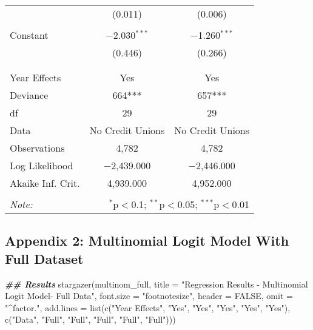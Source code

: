 \documentclass[a4paper,nobind]{templates/ociamthesis}
\newenvironment{Shaded}{\begin{snugshade}}{\end{snugshade}}
\newcommand{\AttributeTok}[1]{\textcolor[rgb]{0.77,0.63,0.00}{#1}}
\newcommand{\ConstantTok}[1]{\textcolor[rgb]{0.00,0.00,0.00}{#1}}
\newcommand{\DocumentationTok}[1]{\textcolor[rgb]{0.56,0.35,0.01}{\textbf{\textit{#1}}}}
\newcommand{\FunctionTok}[1]{\textcolor[rgb]{0.00,0.00,0.00}{#1}}
\newcommand{\NormalTok}[1]{#1}
\newcommand{\StringTok}[1]{\textcolor[rgb]{0.31,0.60,0.02}{#1}}
\renewenvironment{Shaded}
{
  \vspace{10pt}%
  \begin{snugshade}%
}{%
  \end{snugshade}%
  \vspace{8pt}%
}
\begin{document}
\begin{table}[!htbp]
\begin{tabular}{@{\extracolsep{5pt}}lcc}
  & (0.011) & (0.006) \\ 
  & & \\ 
 Constant & $-$2.030$^{***}$ & $-$1.260$^{***}$ \\ 
  & (0.446) & (0.266) \\ 
  & & \\ 
\hline \\[-1.8ex] 
Year Effects & Yes & Yes \\ 
Deviance & 664*** & 657*** \\ 
df & 29 & 29 \\ 
Data & No Credit Unions & No Credit Unions \\ 
Observations & 4,782 & 4,782 \\ 
Log Likelihood & $-$2,439.000 & $-$2,446.000 \\ 
Akaike Inf. Crit. & 4,939.000 & 4,952.000 \\ 
\hline 
\hline \\[-1.8ex] 
\textit{Note:}  & \multicolumn{2}{r}{$^{*}$p$<$0.1; $^{**}$p$<$0.05; $^{***}$p$<$0.01} \\ 
\end{tabular} 
\end{table}

\newpage

\hypertarget{appendix-2-multinomial-logit-model-with-full-dataset}{%
\subsection{Appendix 2: Multinomial Logit Model With Full Dataset}\label{appendix-2-multinomial-logit-model-with-full-dataset}}

\begin{Shaded}
\begin{Highlighting}[]
\DocumentationTok{\#\# Results }
\FunctionTok{stargazer}\NormalTok{(multinom\_full, }\AttributeTok{title =} \StringTok{"Regression Results {-} Multinomial Logit Model{-} Full Data"}\NormalTok{, }\AttributeTok{font.size =} \StringTok{"footnotesize"}\NormalTok{, }\AttributeTok{header =} \ConstantTok{FALSE}\NormalTok{, }\AttributeTok{omit =} \StringTok{"\^{}factor."}\NormalTok{, }\AttributeTok{add.lines =} \FunctionTok{list}\NormalTok{(}\FunctionTok{c}\NormalTok{(}\StringTok{"Year Effects"}\NormalTok{, }\StringTok{"Yes"}\NormalTok{, }\StringTok{"Yes"}\NormalTok{, }\StringTok{"Yes"}\NormalTok{, }\StringTok{"Yes"}\NormalTok{, }\StringTok{"Yes"}\NormalTok{), }\FunctionTok{c}\NormalTok{(}\StringTok{"Data"}\NormalTok{, }\StringTok{"Full"}\NormalTok{, }\StringTok{"Full"}\NormalTok{, }\StringTok{"Full"}\NormalTok{, }\StringTok{"Full"}\NormalTok{, }\StringTok{"Full"}\NormalTok{)))}
\end{Highlighting}
\end{Shaded}
\end{document}
